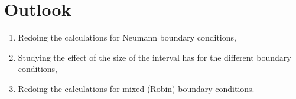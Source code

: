 \section{Outlook}

\begin{frame}
\begin{enumerate}
	\item Redoing the calculations for Neumann boundary conditions,
	\item Studying the effect of the size of the interval has for the different boundary conditions,
	\item Redoing the calculations for mixed (Robin) boundary conditions.
\end{enumerate}



\end{frame}
